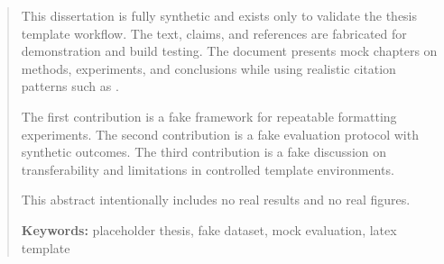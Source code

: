 \begin{abstract}
This dissertation is fully synthetic and exists only to validate the thesis template workflow. The text, claims, and references are fabricated for demonstration and build testing. The document presents mock chapters on methods, experiments, and conclusions while using realistic citation patterns such as \cite{smith2024adaptive,nguyen2023human}.

The first contribution is a fake framework for repeatable formatting experiments. The second contribution is a fake evaluation protocol with synthetic outcomes. The third contribution is a fake discussion on transferability and limitations in controlled template environments.

This abstract intentionally includes no real results and no real figures.

\vspace{1em}
\noindent\textbf{Keywords:} placeholder thesis, fake dataset, mock evaluation, latex template
\end{abstract}
